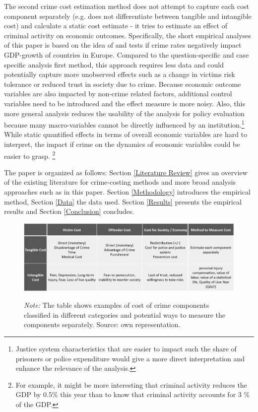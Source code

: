 \documentclass[a4paper,12pt]{article}
\begin{document}
The second crime cost estimation method does not attempt to capture each cost component separately (e.g. does not differentiate between tangible and intangible cost) and calculate a static cost estimate - it tries to estimate an effect of criminal activity on economic outcomes.
Specifically, the short empirical analyses of this paper is based on the idea of \citep{entorf} and tests if crime rates negatively impact GDP-growth of countries in Europe. 
Compared to the question-specific and case specific analysis first method, this approach requires less data and could potentially capture more unobserved effects such as a change in victims risk tolerance or reduced trust in society due to crime.
Because economic outcome variables are also impacted by non-crime related factors, additional control variables need to be introduced and the effect measure is more noisy. 
Also, this more general analysis reduces the usability of the analysis for policy evaluation because many macro-variables cannot be directly influenced by an institution.\footnote{Justice system characteristics that are easier to impact such the share of prisoners or police expenditure would give a more direct interpretation and enhance the relevance of the analysis.} While static quantified effects in terms of overall economic variables are hard to interpret, the impact if crime on the dynamics of economic variables could be easier to grasp. \footnote{For example, it might be more interesting that criminal activity reduces the GDP by 0.5\% this year than to know that criminal activity accounts for 3 \% of the GDP.} 

The paper is organized as follows: Section \ref{Literature Review} gives an overview of the existing literature for crime-costing methods and more broad analysis approaches such as in this paper. Section \ref{Methodology} introduces the empirical method, Section \ref{Data} the data used. Section \ref{Results} presents the empirical results and Section \ref{Conclusion} concludes. 

\begin{figure}
\begin{minipage}{0.9\textwidth}
  \includegraphics[trim={0 0 0 0},width=\linewidth]{charts/table_unit_cost.png}
\begin{flushleft}
\footnotesize{\textit{Note:} The table shows examples of cost of crime components classified in different categories and potential ways to measure the components separately. Source: own representation.
\label{fig:unit_cost_crime}	
}
\end{flushleft}
\end{minipage}
\end{figure}
\end{document}
